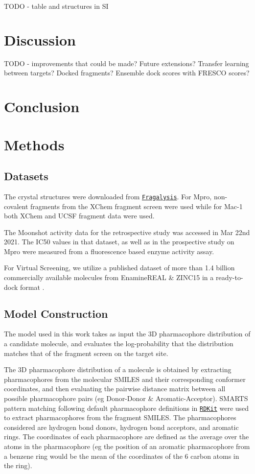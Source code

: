 TODO - table and structures in SI

\section{Discussion}

TODO - improvements that could be made? Future extensions? Transfer learning between targets? Docked fragments? Ensemble dock scores with FRESCO scores?

\section{Conclusion}

\section{Methods} \label{sec:methods}
\subsection{Datasets}

The crystal structures were downloaded from \href{https://fragalysis.diamond.ac.uk/viewer/react/landing}{\texttt{Fragalysis}}. For Mpro, non-covalent fragments from the XChem fragment screen \cite{Douangamath2020XChem} were used while for Mac-1 both XChem and UCSF fragment data were used.

The Moonshot activity data for the retrospective study was accessed in Mar 22nd 2021. The IC50 values in that dataset, as well as in the prospective study on Mpro were measured from a fluorescence based enzyme activity assay.

For Virtual Screening, we utilize a published dataset of more than 1.4 billion commercially available molecules from EnamineREAL \& ZINC15 in a ready-to-dock format \cite{Gorgulla2020VirtualFlow}.

\subsection{Model Construction}
The model used in this work takes as input the 3D pharmacophore distribution of a candidate molecule, and evaluates the log-probability that the distribution matches that of the fragment screen on the target site.

The 3D pharmacophore distribution of a molecule is obtained by extracting pharmacophores from the molecular SMILES and their corresponding conformer coordinates, and then evaluating the pairwise distance matrix between all possible pharmacophore pairs (eg Donor-Donor \& Aromatic-Acceptor). SMARTS pattern matching following default pharmacophore definitions in \href{https://www.rdkit.org/docs/index.html}{\texttt{RDKit}} were used to extract pharmacophores from the fragment SMILES. The pharmacophores considered are hydrogen bond donors, hydrogen bond acceptors, and aromatic rings. The coordinates of each pharmacophore are defined as the average over the atoms in the pharmacophore (eg the position of an aromatic pharmacophore from a benzene ring would be the mean of the coordinates of the 6 carbon atoms in the ring). 

